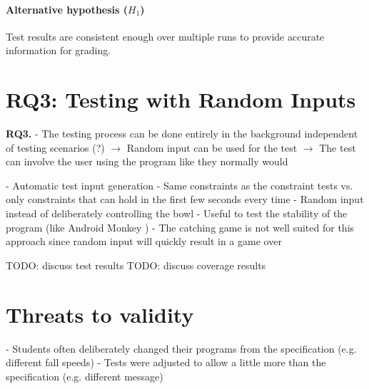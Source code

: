 \paragraph{Alternative hypothesis ($H_1$)}
Test results are consistent enough over multiple runs to provide accurate information for grading.

\section{RQ3: Testing with Random Inputs}


\textbf{RQ3.}
- The testing process can be done entirely in the background independent of testing scenarios (?)
    $\rightarrow$ Random input can be used for the test
    $\rightarrow$ The test can involve the user using the program like they normally would


- Automatic test input generation
- Same constraints as the constraint tests vs. only constraints that can hold in the first few seconds every time
    - Random input instead of deliberately controlling the bowl
    - Useful to test the stability of the program (like Android Monkey \cite{androidmonkey})
    - The catching game is not well suited for this approach since random input will quickly result in a game over

TODO: discuss test results
TODO: discuss coverage results


\section{Threats to validity}
- Students often deliberately changed their programs from the specification (e.g. different fall speeds)
    - Tests were adjusted to allow a little more than the specification (e.g. different message)

